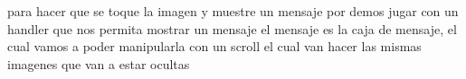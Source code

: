para hacer que se toque la imagen y muestre un mensaje
por demos jugar con un handler que nos permita mostrar un mensaje el mensaje es la caja de mensaje, el cual 
vamos a poder manipularla con un scroll el cual van hacer las mismas imagenes que van a estar ocultas